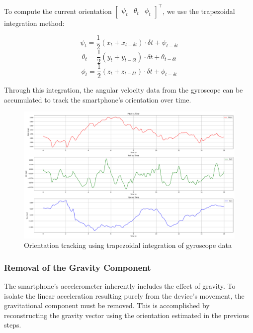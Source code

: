 \documentclass{article}
\begin{document}
    To compute the current orientation $\begin{bmatrix}
        \psi_{t} & \theta_{t} & \phi_{t}
    \end{bmatrix}^{\top}$, we use the trapezoidal integration method:

    \[
        \psi_{t}= \frac{1}{2}(x_{t}+ x_{t - \delta t}) \cdot \delta t + \psi_{t
        - \delta t}
    \]
    \[
        \theta_{t}= \frac{1}{2}(y_{t}+ y_{t - \delta t}) \cdot \delta t + \theta_{t
        - \delta t}
    \]
    \[
        \phi_{t}= \frac{1}{2}(z_{t}+ z_{t - \delta t}) \cdot \delta t + \phi_{t
        - \delta t}
    \]

    Through this integration, the angular velocity data from the gyroscope can be
    accumulated to track the smartphone’s orientation over time.

    \FloatBarrier
    \begin{figure}[ht]
        \centering
        \includegraphics[width=\textwidth]{2_1_4_1.png}
        \caption{Orientation tracking using trapezoidal integration of gyroscope
        data}
        \label{fig:gyro_integration}
    \end{figure}

    \FloatBarrier
    \subsubsection{Removal of the Gravity Component}

    The smartphone's accelerometer inherently includes the effect of gravity. To
    isolate the linear acceleration resulting purely from the device’s movement,
    the gravitational component must be removed. This is accomplished by
    reconstructing the gravity vector using the orientation estimated in the
    previous steps.
\end{document}
